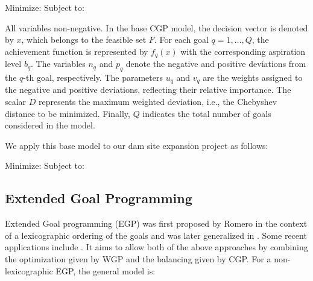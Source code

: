Minimize:
            \EqCGPMinFunctionSix
Subject to:
            \EqGGPMinFunctionSubTwo
            \EqCGPConstraintSeven
            \EqCGPConstraintEight
            \EqGGPMinFunctionSubFour
            \EqCGPConstraintNine

All variables non-negative. In the base \gls{CGP} model, the decision vector is denoted by $x$, which belongs to the feasible set $F$. For each goal $q=1,\dots,Q$, the achievement function is represented by $f_q(x)$ with the corresponding aspiration level $b_q$. The variables $n_q$ and $p_q$ denote the negative and positive deviations from the $q$-th goal, respectively. The parameters $u_q$ and $v_q$ are the weights assigned to the negative and positive deviations, reflecting their relative importance. The scalar $D$ represents the maximum weighted deviation, i.e., the Chebyshev distance to be minimized. Finally, $Q$ indicates the total number of goals considered in the model.

We apply this base model to our dam site expansion project as follows:

Minimize:
            \EqCGPMinFunctionSix
Subject to:
            \EqDamHeightConstraintTwelve
            \EqDamCapacityConstraintThirteen
            \EqReservoirAreaConstraintFourteen
            \EqTemperatureConstraintFifteen
            \EqPopulationConstraintSixteen
            \EqRainfallConstraintSeventeen
            \EqResidenceConstraintEighteen
            \EqFarmlandDistanceConstraintNineteen
            \EqNearestRoadConstraintTwenty
            \EqFarmlandAreaConstraintTwentyOne
            \EqSelectThreeDamsTwentyTwo
            \EqBudgetConstraintTwentyThree
            \EqDConstraintOneNTwentyFour
            \EqDConstraintTwoNTwentyFive
            \EqDConstraintThreeNTwentySix
            \EqDConstraintFourNTwentySix
            \EqDConstraintFiveNTwentySeven
            \EqDConstraintSixNTwentyEight
            \EqDConstraintSevenNTwentyNine
            \EqDConstraintEightNThirty
            \EqDConstraintNineNThirtyOne
            \EqDConstraintTenNThirtyTwo

\subsection{Extended Goal Programming}  
Extended Goal programming (EGP) was first proposed by Romero \cite{ROMERO2001} in the context of a lexicographic ordering of the goals and was later generalized in \cite{ROMERO2004}. Some recent applications include \cite{Guijarro2018,Pal2014}. It aims to allow both of the above approaches by combining the optimization given by WGP and the balancing given by CGP. For a non-lexicographic EGP, the general model is:


